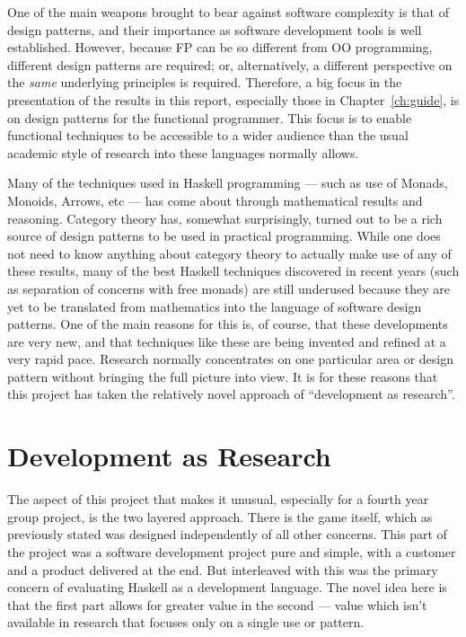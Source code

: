 One of the main weapons brought to bear against software complexity is that of design patterns, and their importance as software development tools is well established. However, because FP can be so different from OO programming, different design patterns are required; or, alternatively, a different perspective on the \emph{same} underlying principles is required. Therefore, a big focus in the presentation of the results in this report, especially those in Chapter~\ref{ch:guide}, is on design patterns for the functional programmer. This focus is to enable functional techniques to be accessible to a wider audience than the usual academic style of research into these languages normally allows.

Many of the techniques used in Haskell programming --- such as use of Monads, Monoids, Arrows, etc --- has come about through mathematical results and reasoning. Category theory has, somewhat surprisingly, turned out to be a rich source of design patterns to be used in practical programming. While one does not need to know anything about category theory to actually make use of any of these results, many of the best Haskell techniques discovered in recent years (such as separation of concerns with free monads) are still underused because they are yet to be translated from mathematics into the language of software design patterns. One of the main reasons for this is, of course, that these developments are very new, and that techniques like these are being invented and refined at a very rapid pace. Research normally concentrates on one particular area or design pattern without bringing the full picture into view. It is for these reasons that this project has taken the relatively novel approach of ``development as research''.

\section{Development as Research}

The aspect of this project that makes it unusual, especially for a fourth year group project, is the two layered approach. There is the game itself, which as previously stated was designed independently of all other concerns. This part of the project was a software development project pure and simple, with a customer and a product delivered at the end. But interleaved with this was the primary concern of evaluating Haskell as a development language. The novel idea here is that the first part allows for greater value in the second --- value which isn't available in research that focuses only on a single use or pattern. 

